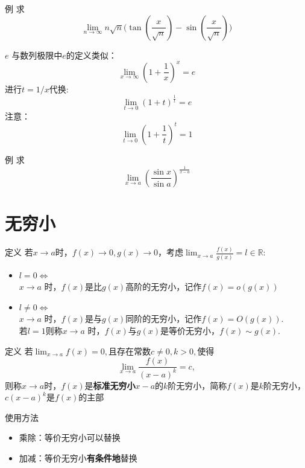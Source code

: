 \documentclass[]{beamer}
\begin{document}
\begin{frame}{例}
    求
    \[
    \lim_{n\rightarrow\infty}n\sqrt{n}\Big(\tan(\frac{x}{\sqrt n})-\sin(\frac{x}{\sqrt n})\Big)
    \]
\end{frame}

\begin{frame}{$e$}
    与数列极限中$e$的定义类似：
    \[
    \lim_{x\rightarrow\infty}(1+\frac1x)^x=e
    \]
    进行$t=1/x$代换:
    \[
    \lim_{t\rightarrow0}(1+t)^{\frac1t}=e
    \]
    \color{red}注意：
    \[
    \lim_{t\rightarrow0}(1+\frac{1}{t})^t=1
    \]
\end{frame}

\begin{frame}{例}
    求
    \[
    \lim_{x\rightarrow a}\left(\frac{\sin x}{\sin a}\right)^{\frac{1}{x-a}}
    \]
\end{frame}

\section{无穷小}

\begin{frame}{定义}
    若$x\rightarrow a$时，$f(x)\rightarrow 0, g(x)\rightarrow 0$，考虑$\displaystyle\lim_{x\rightarrow a}\frac{f(x)}{g(x)}=l\in\mathbb R$:
    \begin{itemize}
        \item $l=0\Leftrightarrow$\\$x\rightarrow a\text{ 时，} f(x)$是比$g(x)$高阶的无穷小，记作$f(x)=o(g(x))$
        \item $l\ne0\Leftrightarrow$\\$x\rightarrow a\text{ 时，} f(x)$是与$g(x)$同阶的无穷小，记作$f(x)=O(g(x))$.\\
        若$l=1$则称$x\rightarrow a\text{ 时，}f(x)$与$g(x)$是等价无穷小，$f(x)\sim g(x)$.
    \end{itemize}
\end{frame}

\begin{frame}{定义}
    若$\displaystyle\lim_{x\rightarrow a}f(x)=0,$且存在常数$c\ne0,k>0,$使得
    \[
    \lim_{x\rightarrow a}\frac{f(x)}{(x-a)^k}=c,
    \]
    则称$x\rightarrow a$时，$f(x)$是\textbf{标准无穷小}$x-a$的$k$阶无穷小，简称$f(x)$是$k$阶无穷小，$c(x-a)^k$是$f(x)$的主部
\end{frame}

\begin{frame}{使用方法}
    \begin{itemize}
        \item 乘除：等价无穷小可以替换
        \item 加减：等价无穷小\textbf{有条件地}替换
    \end{itemize}
\end{frame}
\end{document}

